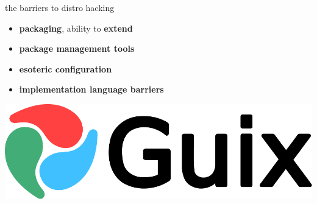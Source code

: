 \documentclass{beamer}
\begin{document}
\begin{frame}[plain]
\end{frame}

\begin{frame}{the barriers to distro hacking}
  \Large{
  \begin{itemize}
  \item \textbf{packaging}, ability to \textbf{extend}
  \item \textbf{package management tools}
  \item \textbf{esoteric configuration}
  \item \textbf{implementation language barriers}
  \end{itemize}
  }
\end{frame}

\begin{frame}[plain]
  \includegraphics[width=\textwidth]{images/guix-logo}
\end{frame}
\end{document}
